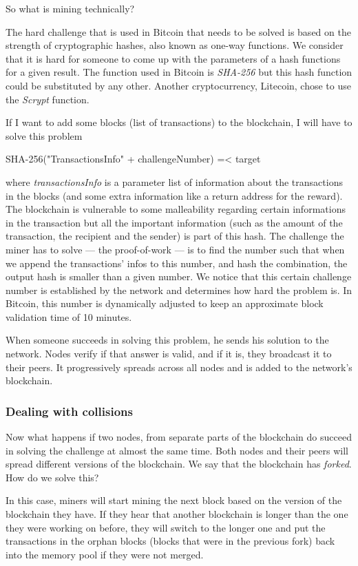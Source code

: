 \documentclass{vldb}
\begin{document}
So what is mining technically?

The hard challenge that is used in Bitcoin that needs to be solved is based on the strength of cryptographic hashes, also known as one-way functions. We consider that it is hard for someone to come up with the parameters of a hash functions for a given result. The function used in Bitcoin is \emph{SHA-256} but this hash function could be substituted by any other. Another cryptocurrency, Litecoin, chose to use the \emph{Scrypt} function.

If I want to add some blocks (list of transactions) to the blockchain, I will have to solve this problem
\begin{center}
SHA-256("TransactionsInfo" + challengeNumber) =< target
\end{center}
where \emph{transactionsInfo} is a parameter list of information about the transactions in the blocks (and some extra information like a return address for the reward). The blockchain is vulnerable to some malleability regarding certain informations in the transaction but all the important information (such as the amount of the transaction, the recipient and the sender) is part of this hash.
The challenge the miner has to solve --- the proof-of-work --- is to find the number such that when we append the transactions' infos to this number, and hash the combination, the output hash is smaller than a given number.
We notice that this certain challenge number is established by the network and determines how hard the problem is. In Bitcoin, this number is dynamically adjusted to keep an approximate block validation time of 10 minutes.\cite{hashCash}

When someone succeeds in solving this problem, he sends his solution to the network. Nodes verify if that answer is valid, and if it is, they broadcast it to their peers. It progressively spreads across all nodes and is added to the network's blockchain. 

\subsubsection{Dealing with collisions}

Now what happens if two nodes, from separate parts of the blockchain do succeed in solving the challenge at almost the same time. Both nodes and their peers will spread different versions of the blockchain. We say that the blockchain has \emph{forked}. How do we solve this?

In this case, miners will start mining the next block based on the version of the blockchain they have. If they hear that another blockchain is longer than the one they were working on before, they will switch to the longer one and put the transactions in the orphan blocks (blocks that were in the previous fork) back into the memory pool if they were not merged. 
\end{document}
